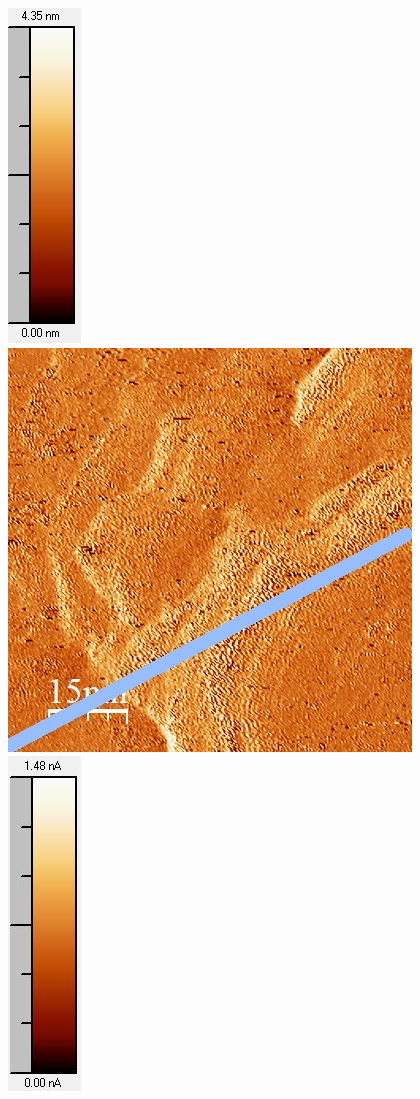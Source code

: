 \documentclass[12pt,a4paper]{article}
\begin{document}
\begin{figure}[H]
\includegraphics[scale=0.6]{Bilder/Anhang/Zeit/0_08_Zeit_nach_Skala.jpg}
\includegraphics[scale=0.6]{Bilder/Anhang/Zeit/Strom/0_080_Zeit_vor_Strom.jpg}
\includegraphics[scale=0.6]{Bilder/Anhang/Zeit/Strom/0_080_Zeit_vor_Strom_Skala.jpg}

\end{figure}
\end{document}

